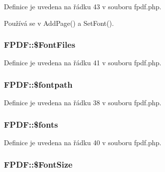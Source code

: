 Definice je uvedena na řádku 43 v souboru fpdf.\-php.



Používá se v Add\-Page() a Set\-Font().

\hypertarget{class_f_p_d_f_a84252c77b8f99df59e282bb23e7c9194}{
\subsubsection[{\$\-Font\-Files}]{\setlength{\rightskip}{0pt plus 5cm}F\-P\-D\-F\-::\$\-Font\-Files}}\label{class_f_p_d_f_a84252c77b8f99df59e282bb23e7c9194}


Definice je uvedena na řádku 41 v souboru fpdf.\-php.

\hypertarget{class_f_p_d_f_ab3884861f6396ba263c88adc1644f61f}{
\subsubsection[{\$fontpath}]{\setlength{\rightskip}{0pt plus 5cm}F\-P\-D\-F\-::\$fontpath}}\label{class_f_p_d_f_ab3884861f6396ba263c88adc1644f61f}


Definice je uvedena na řádku 38 v souboru fpdf.\-php.

\hypertarget{class_f_p_d_f_ad9fe36831d63d0ef57539a0cccef2b49}{
\subsubsection[{\$fonts}]{\setlength{\rightskip}{0pt plus 5cm}F\-P\-D\-F\-::\$fonts}}\label{class_f_p_d_f_ad9fe36831d63d0ef57539a0cccef2b49}


Definice je uvedena na řádku 40 v souboru fpdf.\-php.

\hypertarget{class_f_p_d_f_ab99639f298b8daefa72e6fbc487eeae6}{
\subsubsection[{\$\-Font\-Size}]{\setlength{\rightskip}{0pt plus 5cm}F\-P\-D\-F\-::\$\-Font\-Size}}\label{class_f_p_d_f_ab99639f298b8daefa72e6fbc487eeae6}


